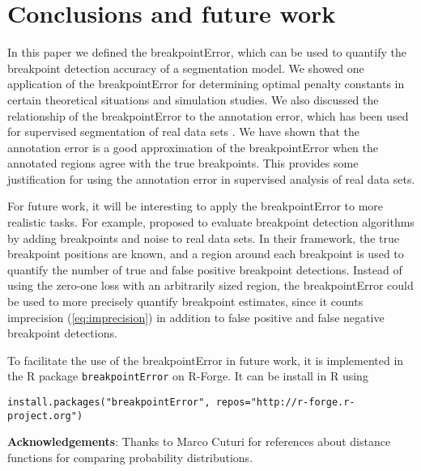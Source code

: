\documentclass{jsfds} %
\begin{document}
\section{Conclusions and future work}

In this paper we defined the breakpointError, which can be used to
quantify the breakpoint detection accuracy of a segmentation model. We
showed one application of the breakpointError for determining optimal
penalty constants in certain theoretical situations and simulation
studies. We also discussed the relationship of the breakpointError to
the annotation error, which has been used for supervised segmentation
of real data sets \citep{HOCKING-breakpoints, HOCKING-penalties,
  SegAnnDB}. We have shown that the annotation error is a good
approximation of the breakpointError when the annotated regions agree
with the true breakpoints. This provides some justification for using
the annotation error in supervised analysis of real data sets.

For future work, it will be interesting to apply the breakpointError
to more realistic tasks. For example, \citet{perf-eval-framework}
proposed to evaluate breakpoint detection algorithms by adding
breakpoints and noise to real data sets. In their framework, the true
breakpoint positions are known, and a region around each breakpoint is
used to quantify the number of true and false positive breakpoint
detections. Instead of using the zero-one loss with an arbitrarily
sized region, the breakpointError could be used to more precisely
quantify breakpoint estimates, since it counts imprecision
(\ref{eq:imprecision}) in addition to false positive and false
negative breakpoint detections.

To facilitate the use of the breakpointError in future work, it is
implemented in the R package \verb|breakpointError| on R-Forge. It can
be install in R using

\begin{verbatim}
install.packages("breakpointError", repos="http://r-forge.r-project.org")
\end{verbatim}

\textbf{Acknowledgements}: Thanks to Marco Cuturi for references about
distance functions for comparing probability distributions.

%

\end{document}
